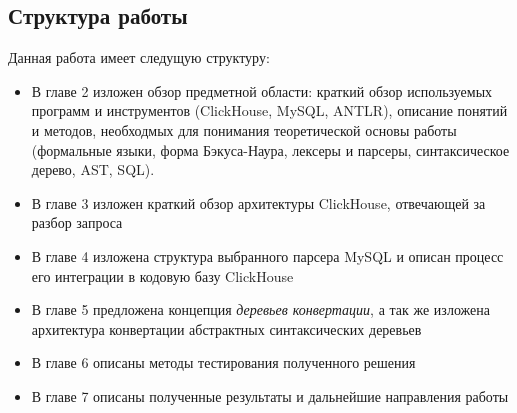 \subsection{Структура работы}
Данная работа имеет следущую структуру:
\begin{itemize}
    \item В главе 2 изложен обзор предметной области: краткий обзор используемых программ и инструментов (ClickHouse, MySQL, ANTLR), описание понятий и методов, необходмых для понимания теоретической основы работы (формальные языки, форма Бэкуса-Наура, лексеры и парсеры, синтаксическое дерево, AST, SQL).
    \item В главе 3 изложен краткий обзор архитектуры ClickHouse, отвечающей за разбор запроса
    \item В главе 4 изложена структура выбранного парсера MySQL и описан процесс его интеграции в кодовую базу ClickHouse
    \item В главе 5 предложена концепция \textit{деревьев конвертации}, а так же изложена архитектура конвертации абстрактных синтаксических деревьев
    \item В главе 6 описаны методы тестирования полученного решения
    \item В главе 7 описаны полученные результаты и дальнейшие направления работы
\end{itemize}
